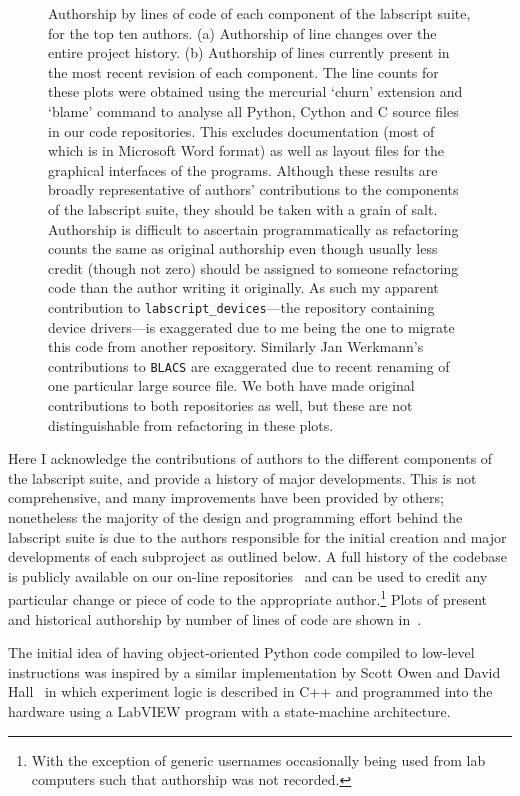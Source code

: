 \begin{figure}
    \caption{Authorship by lines of code of each component of the labscript suite, for the top ten authors. (a) Authorship of line changes over the entire project history. (b) Authorship of lines currently present in the most recent revision of each component. The line counts for these plots were obtained using the mercurial `churn' extension and `blame' command to analyse all Python, Cython and C source files in our code repositories. This excludes documentation (most of which is in Microsoft Word format) as well as layout files for the graphical interfaces of the programs. Although these results are broadly representative of authors' contributions to the components of the labscript suite, they should be taken with a grain of salt. Authorship is difficult to ascertain programmatically as refactoring counts the same as original authorship even though usually less credit (though not zero) should be assigned to someone refactoring code than the author writing it originally. As such my apparent contribution to \texttt{labscript\_devices}---the repository containing device drivers---is exaggerated due to me being the one to migrate this code from another repository. Similarly Jan Werkmann's contributions to \texttt{BLACS} are exaggerated due to recent renaming of one particular large source file. We both have made original contributions to both repositories as well, but these are not distinguishable from refactoring in these plots.}\label{fig:line_counts}
\end{figure}

Here I acknowledge the contributions of authors to the different components of the labscript suite, and provide a history of major developments. This is not comprehensive, and many improvements have been provided by others; nonetheless the majority of the design and programming effort behind the labscript suite is due to the authors responsible for the initial creation and major developments of each subproject as outlined below. A full history of the codebase is publicly available on our on-line repositories~\cite{monash_univeristy_labscript_2018, starkey_qtutils_2018, billington_zprocess_2018} and can be used to credit any particular change or piece of code to the appropriate author.\footnote{With the exception of generic usernames occasionally being used from lab computers such that authorship was not recorded.} Plots of present and historical authorship by number of lines of code are shown in~.

The initial idea of having object-oriented Python code compiled to low-level instructions was inspired by a similar implementation by Scott Owen and David Hall~\cite{owen_fast_2003} in which experiment logic is described in C++ and programmed into the hardware using a LabVIEW program with a state-machine architecture.

